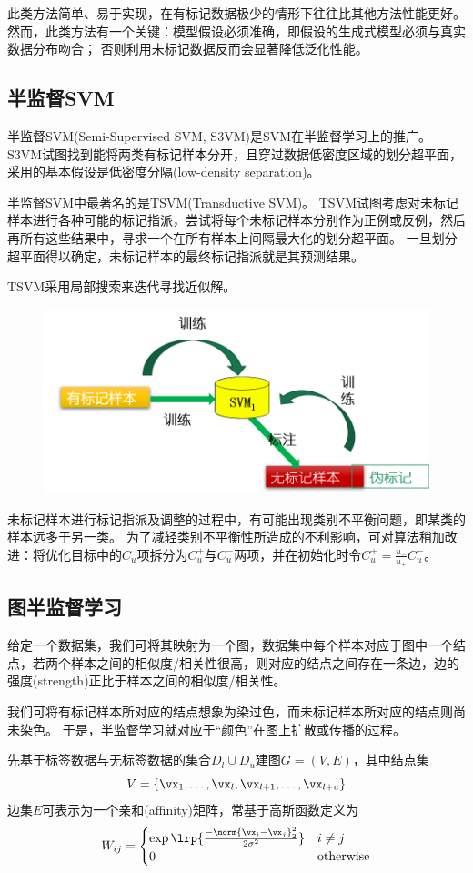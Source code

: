 此类方法简单、易于实现，在有标记数据极少的情形下往往比其他方法性能更好。
然而，此类方法有一个关键：模型假设必须准确，即假设的生成式模型必须与真实数据分布吻合；
否则利用未标记数据反而会显著降低泛化性能。

\subsection{半监督SVM}
半监督SVM(Semi-Supervised SVM, S3VM)是SVM在半监督学习上的推广。
S3VM试图找到能将两类有标记样本分开，且穿过数据低密度区域的划分超平面，采用的基本假设是低密度分隔(low-density separation)。

半监督SVM中最著名的是TSVM(Transductive SVM)。
TSVM试图考虑对未标记样本进行各种可能的标记指派，尝试将每个未标记样本分别作为正例或反例，然后再所有这些结果中，寻求一个在所有样本上间隔最大化的划分超平面。
一旦划分超平面得以确定，未标记样本的最终标记指派就是其预测结果。

TSVM采用局部搜索来迭代寻找近似解。
\begin{figure}[H]
\centering
\includegraphics[width=0.6\linewidth]{fig/TSVM.png}
\end{figure}

未标记样本进行标记指派及调整的过程中，有可能出现类别不平衡问题，即某类的样本远多于另一类。
为了减轻类别不平衡性所造成的不利影响，可对算法稍加改进：将优化目标中的$C_u$项拆分为$C_u^+$与$C_u^-$两项，并在初始化时令$C_u^+=\frac{u_-}{u_+}C_u^-$。

\subsection{图半监督学习}
给定一个数据集，我们可将其映射为一个图，数据集中每个样本对应于图中一个结点，若两个样本之间的相似度/相关性很高，则对应的结点之间存在一条边，边的强度(strength)正比于样本之间的相似度/相关性。

我们可将有标记样本所对应的结点想象为染过色，而未标记样本所对应的结点则尚未染色。
于是，半监督学习就对应于“颜色”在图上扩散或传播的过程。

先基于标签数据与无标签数据的集合$D_l\cup D_u$建图$G=(V,E)$，其中结点集
\[V=\{\vx_1,\ldots,\vx_l,\vx_{l+1},\ldots,\vx_{l+u}\}\]
边集$E$可表示为一个亲和(affinity)矩阵，常基于高斯函数定义为
\[W_{ij}=\begin{cases}
\exp\lrp{\frac{-\norm{\vx_i-\vx_j}_2^2}{2\sigma^2}} & i\ne j\\
0 & \text{otherwise}
\end{cases}\]

